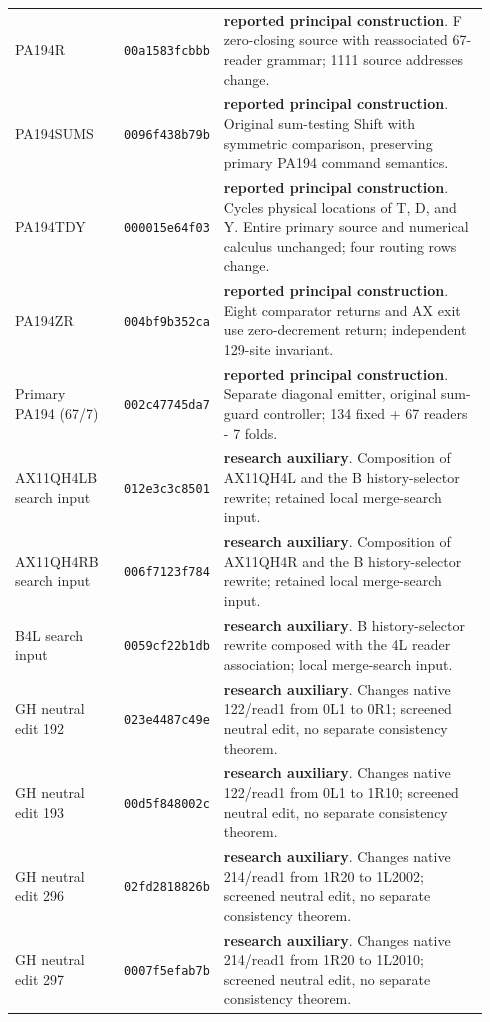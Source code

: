 {\begin{longtable}{@{}>{\raggedright\arraybackslash}p{0.23\linewidth}>{\raggedright\arraybackslash}p{0.145\linewidth}>{\raggedright\arraybackslash}p{0.56\linewidth}@{}}
PA194R & \texttt{00a1583fcbbb} & \textbf{reported principal construction}. F zero-closing source with reassociated 67-reader grammar; 1111 source addresses change.\\[4pt]
PA194SUMS & \texttt{0096f438b79b} & \textbf{reported principal construction}. Original sum-testing Shift with symmetric comparison, preserving primary PA194 command semantics.\\[4pt]
PA194TDY & \texttt{000015e64f03} & \textbf{reported principal construction}. Cycles physical locations of T, D, and Y. Entire primary source and numerical calculus unchanged; four routing rows change.\\[4pt]
PA194ZR & \texttt{004bf9b352ca} & \textbf{reported principal construction}. Eight comparator returns and AX exit use zero-decrement return; independent 129-site invariant.\\[4pt]
Primary PA194 (67/7) & \texttt{002c47745da7} & \textbf{reported principal construction}. Separate diagonal emitter, original sum-guard controller; 134 fixed + 67 readers - 7 folds.\\[4pt]
AX11QH4LB search input & \texttt{012e3c3c8501} & \textbf{research auxiliary}. Composition of AX11QH4L and the B history-selector rewrite; retained local merge-search input.\\[4pt]
AX11QH4RB search input & \texttt{006f7123f784} & \textbf{research auxiliary}. Composition of AX11QH4R and the B history-selector rewrite; retained local merge-search input.\\[4pt]
B4L search input & \texttt{0059cf22b1db} & \textbf{research auxiliary}. B history-selector rewrite composed with the 4L reader association; local merge-search input.\\[4pt]
GH neutral edit 192 & \texttt{023e4487c49e} & \textbf{research auxiliary}. Changes native 122/read1 from 0L1 to 0R1; screened neutral edit, no separate consistency theorem.\\[4pt]
GH neutral edit 193 & \texttt{00d5f848002c} & \textbf{research auxiliary}. Changes native 122/read1 from 0L1 to 1R10; screened neutral edit, no separate consistency theorem.\\[4pt]
GH neutral edit 296 & \texttt{02fd2818826b} & \textbf{research auxiliary}. Changes native 214/read1 from 1R20 to 1L2002; screened neutral edit, no separate consistency theorem.\\[4pt]
GH neutral edit 297 & \texttt{0007f5efab7b} & \textbf{research auxiliary}. Changes native 214/read1 from 1R20 to 1L2010; screened neutral edit, no separate consistency theorem.\\[4pt]

\end{longtable}}
